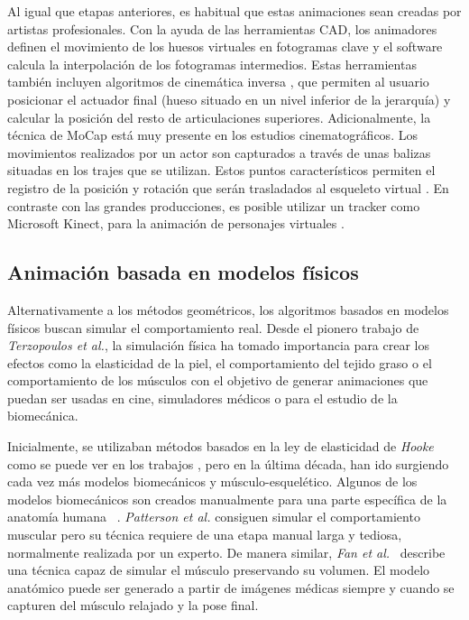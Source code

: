 Al igual que etapas anteriores, es habitual que estas animaciones sean creadas por artistas profesionales. Con la ayuda de las herramientas \ac{CAD}, los animadores definen el movimiento de los huesos virtuales en fotogramas clave y el software calcula la interpolación de los fotogramas intermedios. Estas herramientas también incluyen algoritmos de cinemática inversa \cite{Shi:2007}, que permiten al usuario posicionar el actuador final (hueso situado en un nivel inferior de la jerarquía) y calcular la posición del resto de articulaciones superiores. 
Adicionalmente, la técnica de \ac{MoCap} está muy presente en los estudios cinematográficos. Los movimientos realizados por un actor son capturados a través de unas balizas situadas en los trajes que se utilizan. Estos puntos característicos permiten el registro de la posición y rotación que serán trasladados al esqueleto virtual \cite{Menache:1999}. En contraste con las grandes producciones, es posible utilizar un \ac{tracker} como Microsoft Kinect, para la animación de personajes virtuales \cite{Liu:2018}.


\subsection{Animación basada en modelos físicos}
\label{art:fisica}

Alternativamente a los métodos geométricos, los algoritmos basados en modelos físicos buscan simular el comportamiento real. Desde el pionero trabajo de \emph{Terzopoulos et al.}\cite{terzopoulos1987elastically}, la simulación física ha tomado importancia para crear los efectos como la elasticidad de la piel, el comportamiento del tejido graso o el comportamiento de los músculos con el objetivo de generar animaciones que puedan ser usadas en cine, simuladores médicos o para el estudio de la biomecánica. 

Inicialmente, se utilizaban métodos basados en la ley de elasticidad de \emph{Hooke} como se puede ver en los trabajos \cite{russell93,wilhelms1995modeling}, pero en la última década, han ido surgiendo cada vez más modelos biomecánicos y músculo-esquelético. Algunos de los modelos biomecánicos son creados manualmente para una parte específica de la anatomía humana ~\cite{Lee2009}. \emph{Patterson et al.} \cite{Patterson2012} consiguen simular el comportamiento muscular pero su técnica requiere de una etapa manual larga y tediosa, normalmente realizada por un experto. De manera similar, \emph{Fan et al.}~ \cite{Fan2014} describe una técnica capaz de simular el músculo preservando su volumen. El modelo anatómico puede ser generado a partir de imágenes médicas siempre y cuando se capturen del músculo relajado y la pose final. 

